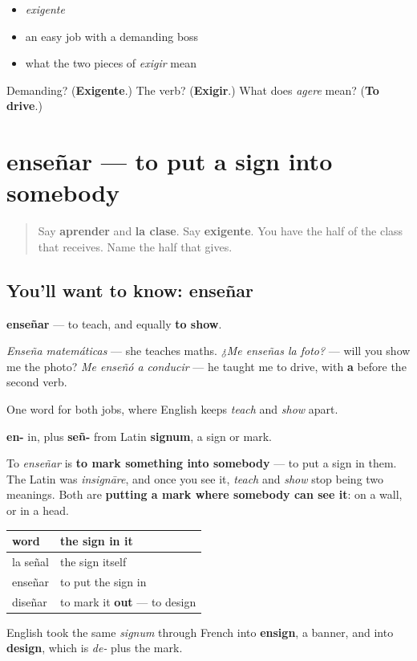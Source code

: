 \begin{itemize}
\raggedright
  \item \emph{exigente}
  \item an easy job with a demanding boss
  \item what the two pieces of \emph{exigir} mean
\end{itemize}

\begin{tcolorbox}[breakable,colback=teal!4,colframe=teal!35!black,title={Before you move on}]
Demanding? (\textbf{Exigente}.) The verb? (\textbf{Exigir}.) What does \emph{agere} mean? (\textbf{To drive}.)
\end{tcolorbox}
\section[enseñar]{enseñar — to put a sign into somebody}

\label{lesson:ES-C445-ensenar}



\begin{quote}
Say \textbf{aprender} and \textbf{la clase}. Say \textbf{exigente}. You have the half of the class that receives. Name the half that gives.
\end{quote}

\subsection*{You'll want to know: enseñar}
\textbf{enseñar} — to teach, and equally \textbf{to show}.

\emph{Enseña matemáticas} — she teaches maths. \emph{¿Me enseñas la foto?} — will you show me the photo? \emph{Me enseñó a conducir} — he taught me to drive, with \textbf{a} before the second verb.

One word for both jobs, where English keeps \emph{teach} and \emph{show} apart.

\begin{cousinweb}
\textbf{en-} in, plus \textbf{señ-} from Latin \textbf{signum}, a sign or mark.

To \emph{enseñar} is \textbf{to mark something into somebody} — to put a sign in them. The Latin was \emph{insignāre}, and once you see it, \emph{teach} and \emph{show} stop being two meanings. Both are \textbf{putting a mark where somebody can see it}: on a wall, or in a head.

\noindent
\begin{tabularx}{\linewidth}{@{}>{\raggedright\arraybackslash}X>{\raggedright\arraybackslash}X@{}}
\toprule
\textbf{word} & \textbf{the sign in it} \\
\midrule
la señal & the sign itself \\
enseñar & to put the sign in \\
diseñar & to mark it \textbf{out} — to design \\
\bottomrule
\end{tabularx}

English took the same \emph{signum} through French into \textbf{ensign}, a banner, and into \textbf{design}, which is \emph{de-} plus the mark.
\end{cousinweb}

